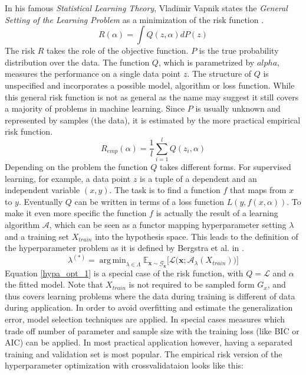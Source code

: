\documentclass[english]{article}
\newcommand{\x}{\mathbf{x}}
\newcommand{\E}{\mathbb{E}}
\DeclareMathOperator*{\argmin}{arg\,min}
\begin{document}
In his famous \textit{Statistical Learning Theory}, Vladimir Vapnik states the \textit{General Setting of the Learning Problem} as a minimization of the risk function \cite{vapnik_overview_1999}.
\begin{equation}
R(\alpha) = \int Q(z,\alpha)dP(z)
\label{risk}
\end{equation}
The risk $R$ takes the role of the objective function. $P$ is the true probability distribution over the data. The function $Q$, which is parametrized by $alpha$, measures the performance on a single data point $z$. The structure of $Q$ is unspecified and incorporates a possible model, algorithm or loss function. While this general risk function is not as general as the name may suggest it still covers a majority of problems in machine learning. Since $P$ is usually unknown and represented by samples (the data), it is estimated by the more practical empirical risk function.
\begin{equation}
R_{emp}(\alpha) = \frac{1}{l} \sum_{i=1}^l Q(z_i,\alpha)
\label{empirical risk}
\end{equation}
Depending on the problem the function $Q$ takes different forms. For supervised learning, for example, a data point $z$ is a tuple of a dependent and an independent variable $(x,y)$. The task is to find a function $f$ that maps from $x$ to $y$. Eventually $Q$ can be written in terms of a loss function $L(y,f(x,\alpha))$.
To make it even more specific the function $f$ is actually the result of a learning algorithm $\mathcal{A}$, which can be seen as a functor mapping hyperparameter setting $\lambda$ and a training set $X_{train}$ into the hypothesis space. This leads to the definition of the hyperparameter problem as it is defined by Bergstra et al. in \cite{bergstra_random_2012}.
\begin{equation}
\lambda^{(*)} = \argmin_{\lambda \in \Lambda} \E_{\x \sim \mathcal{G}_\x}\big[\mathcal{L}\big(\x;\mathcal{A}_\lambda(X_{train})\big)\big]
\label{hypa_opt_1}
\end{equation}
Equation \ref{hypa_opt_1} is a special case of the risk function, with $Q = \mathcal{L}$ and $\alpha$ the fitted model. Note that $X_{train}$ is not required to be sampled form $G_x$, and thus covers learning problems where the data during training is different of data during application.
In order to avoid overfitting and estimate the generalization error, model selection techniques are applied. In special cases measures which trade off number of parameter and sample size with the training loss (like BIC or AIC) can be applied. In most practical application however, having a separated training and validation set is most popular. The empirical risk version of the hyperparameter optimization with crossvalidataion looks like this:
\end{document}
